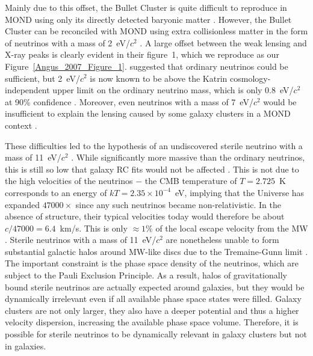 \documentclass[fleqn,usenatbib,useAMS,onecolumn]{mnras} %
\begin{document}
Mainly due to this offset, the Bullet Cluster is quite difficult to reproduce in MOND using only its directly detected baryonic matter \citep{Knebe_2009}. However, the Bullet Cluster can be reconciled with MOND using extra collisionless matter in the form of neutrinos with a mass of 2~eV/$c^2$ \citep{Angus_2007}. A large offset between the weak lensing and X-ray peaks is clearly evident in their figure~1, which we reproduce as our Figure~\ref{Angus_2007_Figure_1}. \citet{Angus_2007} suggested that ordinary neutrinos could be sufficient, but 2~eV/$c^2$ is now known to be above the Katrin cosmology-independent upper limit on the ordinary neutrino mass, which is only 0.8~eV/$c^2$ at 90\% confidence \citep{Katrin_2019, Katrin_2022}. Moreover, even neutrinos with a mass of 7~eV/$c^2$ would be insufficient to explain the lensing caused by some galaxy clusters in a MOND context \citep{Natarajan_2008}.

These difficulties led to the hypothesis of an undiscovered sterile neutrino with a mass of 11~eV/$c^2$ \citep{Angus_2009}. While significantly more massive than the ordinary neutrinos, this is still so low that galaxy RC fits would not be affected \citep{Angus_2010_minimum_neutrino_mass}. This is not due to the high velocities of the neutrinos $-$ the CMB temperature of $T = 2.725$~K corresponds to an energy of $kT = 2.35 \times 10^{-4}$~eV, implying that the Universe has expanded $47000\times$ since any such neutrinos became non-relativistic. In the absence of structure, their typical velocities today would therefore be about $c/47000 = 6.4$~km/s. This is only $\approx 1\%$ of the local escape velocity from the MW \citep{Williams_2017, Monari_2018}. Sterile neutrinos with a mass of 11~eV/$c^2$ are nonetheless unable to form substantial galactic halos around MW-like discs due to the Tremaine-Gunn limit \citep{Tremaine_Gunn_1979}. The important constraint is the phase space density of the neutrinos, which are subject to the Pauli Exclusion Principle. As a result, halos of gravitationally bound sterile neutrinos are actually expected around galaxies, but they would be dynamically irrelevant even if all available phase space states were filled. Galaxy clusters are not only larger, they also have a deeper potential and thus a higher velocity dispersion, increasing the available phase space volume. Therefore, it is possible for sterile neutrinos to be dynamically relevant in galaxy clusters but not in galaxies.
\end{document}
